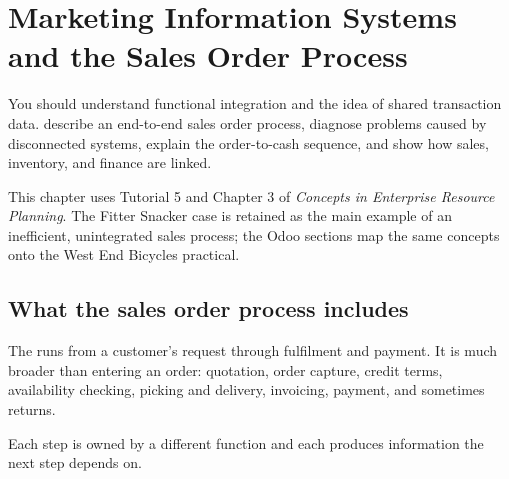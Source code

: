 \chapter{Marketing Information Systems and the Sales Order Process}
\label{ch:sales-order}

\chapterguide
  {You should understand functional integration and the idea of shared transaction data.}
  {describe an end-to-end sales order process, diagnose problems caused by disconnected systems, explain the order-to-cash sequence, and show how sales, inventory, and finance are linked.}

\begin{sourcebasis}
This chapter uses Tutorial 5 and Chapter 3 of \emph{Concepts in Enterprise
Resource Planning}. The Fitter Snacker case is retained as the main example of
an inefficient, unintegrated sales process; the Odoo sections map the same
concepts onto the West End Bicycles practical.
\end{sourcebasis}

\section{What the sales order process includes}

The  runs from a customer's request through fulfilment
and payment. It is much broader than entering an order: quotation, order
capture, credit terms, availability checking, picking and delivery, invoicing,
payment, and sometimes returns.

Each step is owned by a different function and each produces information the
next step depends on.

